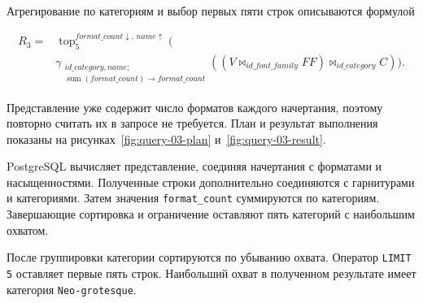 
Агрегирование по категориям и выбор первых пяти строк описываются формулой

\begingroup
\small
\[
\begin{aligned}
R_3 ={}& \operatorname{top}_{5}^{format\_count\downarrow,\,name\uparrow}
\biggl(\\
&
    \gamma_{\substack{id\_category,name;\\
    \operatorname{sum}(format\_count) \rightarrow format\_count}}
    \left(
        \left(V \bowtie_{id\_font\_family} FF\right)
        \bowtie_{id\_category} C
    \right)
\biggr).
\end{aligned}
\]
\endgroup

Представление уже содержит число форматов каждого начертания, поэтому повторно
считать их в запросе не требуется. План и результат выполнения показаны на
рисунках~\ref{fig:query-03-plan} и~\ref{fig:query-03-result}.


PostgreSQL вычисляет представление, соединяя начертания с форматами и
насыщенностями. Полученные строки дополнительно соединяются с гарнитурами и
категориями. Затем значения \texttt{format_count} суммируются по
категориям. Завершающие сортировка и ограничение оставляют пять категорий с
наибольшим охватом.


После группировки категории сортируются по убыванию охвата. Оператор
\texttt{LIMIT 5} оставляет первые пять строк. Наибольший охват в
полученном результате имеет категория \texttt{Neo-grotesque}.
